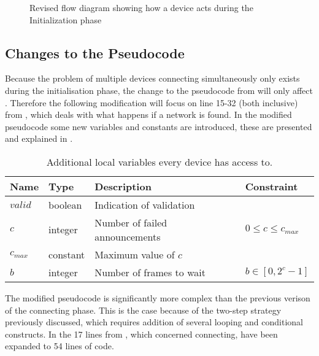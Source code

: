 \begin{figure}[ht]
    \centering \footnotesize
    
    \caption{Revised flow diagram showing how a device acts during the Initialization phase}
    \label{fig:pseudo_flowMultiConnect}
\end{figure}


\subsection{Changes to the Pseudocode} %
\label{sub:changes_to_the_pseudocode}
Because the problem of multiple devices connecting simultaneously only exists during the initialisation phase, the change to the pseudocode from  will only affect .
Therefore the following modification will focus on line 15-32 (both inclusive) from , which deals with what happens if a network is found.
In the modified pseudocode some new variables and constants are introduced, these are presented and explained in .

\begin{table}[H]
    {\setlength{\extrarowheight}{1ex}%
    \begin{tabularx}{\textwidth}{l|l|X|l}
        \toprule
        Name                & Type      & Description & Constraint \\
        \midrule
        $valid$             & boolean   & Indication of validation              \\
        $c$                 & integer   & Number of failed announcements        & $0 \leq c \leq c_{max}$ \\
        $c_{max}$           & constant   & Maximum value of $c$                        \\
        $b$                 & integer   & Number of frames to wait              & $b \in [0, 2^c-1]$ \\
        \bottomrule
    \end{tabularx}}
    \caption{Additional local variables every device has access to.}
    \label{tab:locals_wmulticonnect} 
    \vspace{-10pt}
\end{table}

\noindent
The modified pseudocode is significantly more complex than the previous verison of the connecting phase.
This is the case because of the two-step strategy previously discussed, which requires addition of several looping and conditional constructs.
In  the 17 lines from , which concerned connecting, have been expanded to 54 lines of code. 

